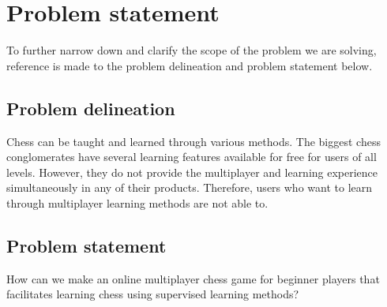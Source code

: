 \chapter{Problem statement}\label{ch:problem-statement}

To further narrow down and clarify the scope of the problem we are solving, reference is made to the problem delineation and
problem statement below.

\section{Problem delineation}\label{sec:problem-delineation}

Chess can be taught and learned through various methods.
The biggest chess conglomerates have several learning features available for free for users of all levels.
However, they do not provide the multiplayer and learning experience simultaneously in any of their products.
Therefore, users who want to learn through multiplayer learning methods are not able to.

\section{Problem statement}\label{sec:problem-statement}

How can we make an online multiplayer chess game for beginner players that facilitates learning chess using supervised
learning methods?
